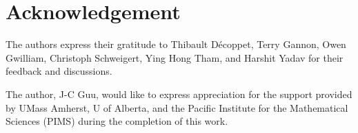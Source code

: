 \section*{Acknowledgement}

The authors express their gratitude to Thibault Décoppet, Terry Gannon, Owen
Gwilliam, Christoph Schweigert, Ying Hong Tham, and Harshit Yadav for their
feedback and discussions.

The author, J-C Guu, would like to express appreciation for the support
provided by UMass Amherst, U of Alberta, and the Pacific Institute for the
Mathematical Sciences (PIMS) during the completion of this work.
